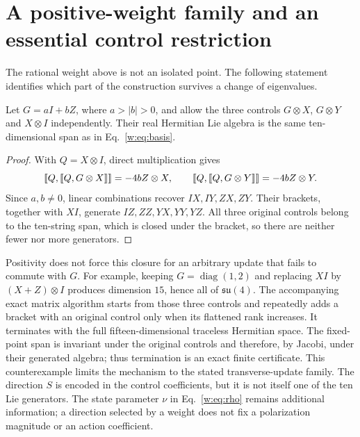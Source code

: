 \section{A positive-weight family and an essential control restriction}
The rational weight above is not an isolated point.
The following statement identifies which part of the construction survives a change of eigenvalues.

\begin{theorem}\label{thm:family}
Let $G=aI+bZ$, where $a>|b|>0$, and allow the three controls
$G\otimes X$, $G\otimes Y$ and $X\otimes I$ independently.
Their real Hermitian Lie algebra is the same ten-dimensional span as in Eq.~\eqref{w:eq:basis}.
\end{theorem}
\begin{proof}
With $Q=X\otimes I$, direct multiplication gives
\begin{equation}
 \left\llbracket Q,\left\llbracket Q,G\otimes X\right\rrbracket\right\rrbracket=-4b Z\otimes X,
 \qquad
 \left\llbracket Q,\left\llbracket Q,G\otimes Y\right\rrbracket\right\rrbracket=-4b Z\otimes Y.
\end{equation}
Since $a,b\ne0$, linear combinations recover $IX,IY,ZX,ZY$.
Their brackets, together with $XI$, generate $IZ,ZZ,YX,YY,YZ$.
All three original controls belong to the ten-string span, which is closed under the bracket, so there are neither fewer nor more generators.
\end{proof}

Positivity does not force this closure for an arbitrary update that fails to commute with $G$.
For example, keeping $G=\operatorname{diag}(1,2)$ and replacing $XI$ by $(X+Z)\otimes I$ produces dimension $15$, hence all of $\mathfrak{su}(4)$.
The accompanying exact matrix algorithm starts from those three controls and repeatedly adds a bracket with an original control only when its flattened rank increases.
It terminates with the full fifteen-dimensional traceless Hermitian space.
The fixed-point span is invariant under the original controls and therefore, by Jacobi, under their generated algebra; thus termination is an exact finite certificate.
This counterexample limits the mechanism to the stated transverse-update family.
The direction $S$ is encoded in the control coefficients, but it is not itself one of the ten Lie generators.
The state parameter $\nu$ in Eq.~\eqref{w:eq:rho} remains additional information; a direction selected by a weight does not fix a polarization magnitude or an action coefficient.
